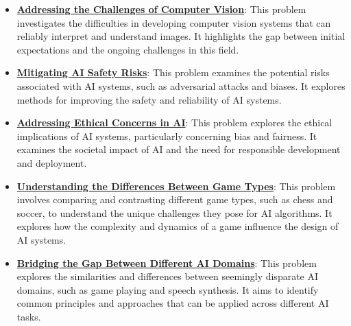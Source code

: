 \documentclass{article}%
\begin{document}
\begin{itemize}[leftmargin=*]
\item \href{https://purdue.brightspace.com/d2l/common/assets/pdfjs-d2l-dist/1.0.14-legacy/web/viewer.html?file=\%2Fcontent\%2Fenforced\%2F1095467-wl.202510.CS.24300.001\%2F02L2-Intro.pdf\%3Fou\%3D1095467\&lang=en-us\&container=d2l-fileviewer-rendered-pdf\&fullscreen=d2l-fileviewer-rendered-pdf-dialog\&height=667#page=15}{\textbf{Addressing the Challenges of Computer Vision}}: This problem investigates the difficulties in developing computer vision systems that can reliably interpret and understand images. It highlights the gap between initial expectations and the ongoing challenges in this field.%
\item \href{https://purdue.brightspace.com/d2l/common/assets/pdfjs-d2l-dist/1.0.14-legacy/web/viewer.html?file=\%2Fcontent\%2Fenforced\%2F1095467-wl.202510.CS.24300.001\%2F02L2-Intro.pdf\%3Fou\%3D1095467\&lang=en-us\&container=d2l-fileviewer-rendered-pdf\&fullscreen=d2l-fileviewer-rendered-pdf-dialog\&height=667#page=19}{\textbf{Mitigating AI Safety Risks}}: This problem examines the potential risks associated with AI systems, such as adversarial attacks and biases. It explores methods for improving the safety and reliability of AI systems.%
\item \href{https://purdue.brightspace.com/d2l/common/assets/pdfjs-d2l-dist/1.0.14-legacy/web/viewer.html?file=\%2Fcontent\%2Fenforced\%2F1095467-wl.202510.CS.24300.001\%2F02L2-Intro.pdf\%3Fou\%3D1095467\&lang=en-us\&container=d2l-fileviewer-rendered-pdf\&fullscreen=d2l-fileviewer-rendered-pdf-dialog\&height=667#page=20}{\textbf{Addressing Ethical Concerns in AI}}: This problem explores the ethical implications of AI systems, particularly concerning bias and fairness. It examines the societal impact of AI and the need for responsible development and deployment.%
\item \href{https://purdue.brightspace.com/d2l/common/assets/pdfjs-d2l-dist/1.0.14-legacy/web/viewer.html?file=\%2Fcontent\%2Fenforced\%2F1095467-wl.202510.CS.24300.001\%2F02L2-Intro.pdf\%3Fou\%3D1095467\&lang=en-us\&container=d2l-fileviewer-rendered-pdf\&fullscreen=d2l-fileviewer-rendered-pdf-dialog\&height=667#page=27}{\textbf{Understanding the Differences Between Game Types}}: This problem involves comparing and contrasting different game types, such as chess and soccer, to understand the unique challenges they pose for AI algorithms. It explores how the complexity and dynamics of a game influence the design of AI systems.%
\item \href{https://purdue.brightspace.com/d2l/common/assets/pdfjs-d2l-dist/1.0.14-legacy/web/viewer.html?file=\%2Fcontent\%2Fenforced\%2F1095467-wl.202510.CS.24300.001\%2F02L2-Intro.pdf\%3Fou\%3D1095467\&lang=en-us\&container=d2l-fileviewer-rendered-pdf\&fullscreen=d2l-fileviewer-rendered-pdf-dialog\&height=667#page=31}{\textbf{Bridging the Gap Between Different AI Domains}}: This problem explores the similarities and differences between seemingly disparate AI domains, such as game playing and speech synthesis. It aims to identify common principles and approaches that can be applied across different AI tasks.%

\end{itemize}
\end{document}
